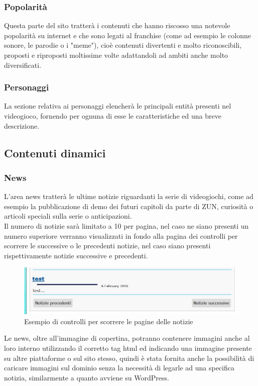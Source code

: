\documentclass[openany, a4paper, 12pt]{report}
\begin{document}
		\subsubsection{Popolarità}
		Questa parte del sito tratterà i contenuti che hanno riscosso una notevole popolarità su internet e che sono legati al franchise (come ad esempio le colonne sonore, le parodie o i "meme"), cioè contenuti divertenti e molto riconoscibili, proposti e riproposti moltissime volte adattandoli ad ambiti anche molto diversificati.
		\subsubsection{Personaggi}
		La sezione relativa ai personaggi elencherà le principali entità presenti nel videogioco, fornendo per ognuna di esse le caratteristiche ed una breve descrizione.

	\subsection{Contenuti dinamici}
		\subsubsection{News}
		L'area news tratterà le ultime notizie riguardanti la serie di videogiochi, come ad esempio la pubblicazione di demo dei futuri capitoli da parte di ZUN, curiosità o articoli speciali sulla serie o anticipazioni.\\
		Il numero di notizie sarà limitato a 10 per pagina, nel caso ne siano presenti un numero superiore verranno visualizzati in fondo alla pagina dei controlli per scorrere le successive o le precedenti notizie, nel caso siano presenti rispettivamente notizie successive e precedenti.
		\begin{figure}[H]
			\centering
			\includegraphics[width=0.8\linewidth]{images/precsuccnews}
			\caption{Esempio di controlli per scorrere le pagine delle notizie}
		\end{figure}
		Le news, oltre all'immagine di copertina, potranno contenere immagini anche al loro interno utilizzando il corretto tag html ed indicando una immagine presente su altre piattaforme o sul sito stesso, quindi è stata fornita anche la possibilità di caricare immagini sul dominio senza la necessità di legarle ad una specifica notizia, similarmente a quanto avviene su WordPress.
\end{document}
